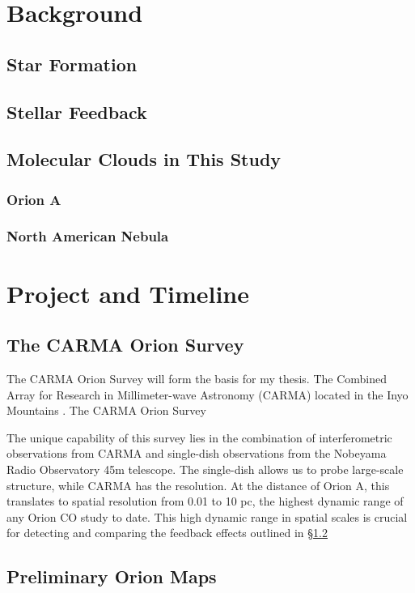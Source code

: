 \section{Background}\label{sec:bkgrd}
\subsection{Star Formation}\label{sec:sf}
\subsection{Stellar Feedback}\label{sec:feedback}
\subsection{Molecular Clouds in This Study}\label{sec:mc}
\subsubsection{Orion A}\label{sec:orion}
\subsubsection{North American Nebula}\label{sec:nan}

\section{Project and Timeline}\label{sec:project}
    \subsection{The CARMA Orion Survey}\label{sec:carma}
    The CARMA Orion Survey will form the basis for my thesis. The Combined Array for Research in Millimeter-wave Astronomy (CARMA) located in the Inyo Mountains . The CARMA Orion Survey 
    
    The unique capability of this survey lies in the combination of interferometric observations from CARMA and single-dish observations from the Nobeyama Radio Observatory 45m telescope. The single-dish allows us to probe large-scale structure, while CARMA has the resolution. At the distance of Orion A, this translates to spatial resolution from 0.01 to 10 pc, the highest dynamic range of any Orion CO study to date. This high dynamic range in spatial scales is crucial for detecting and comparing the feedback effects outlined in \S\ref{sec:feedback}
    \subsection{Preliminary Orion Maps}\label{sec:maps}
    
